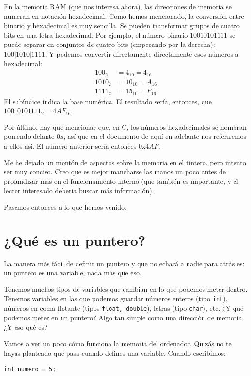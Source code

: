 \documentclass{hxc_cl}
\newcommand{\hex}{0\text{x}}
\begin{document}
En la memoria RAM (que nos interesa ahora), las direcciones de memoria se numeran en notación hexadecimal. Como hemos mencionado, la conversión entre binario y hexadecimal es muy sencilla. Se pueden transformar grupos de cuatro bits en una letra hexadecimal. Por ejemplo, el número binario $10010101111$ se puede separar en conjuntos de cuatro bits (empezando por la derecha): $100|1010|1111$. Y podemos convertir directamente directamente esos números a hexadecimal:
\begin{align*}
100_2&=4_{10}=4_{16}\\
1010_2&=10_{10}=A_{16}\\
1111_2&=15_{10}=F_{16}
\end{align*}
El subíndice indica la base numérica. El resultado sería, entonces, que $10010101111_2=4AF_{16}$.

Por último, hay que mencionar que, en C, los números hexadecimales se nombran poniendo delante 0x, así que en el documento de aquí en adelante nos referiremos a ellos así. El número anterior sería entonces $\hex4AF$.

Me he dejado un montón de aspectos sobre la memoria en el tintero, pero intento ser muy conciso. Creo que es mejor mancharse las manos un poco antes de profundizar más en el funcionamiento interno (que también es importante, y el lector interesado debería buscar más información).

Pasemos entonces a lo que hemos venido.

\section{¿Qué es un puntero?}
La manera más fácil de definir un puntero y que no echará a nadie para atrás es: un puntero es una variable, nada más que eso.

Tenemos muchos tipos de variables que cambian en lo que podemos meter dentro. Tenemos variables en las que podemos guardar números enteros (tipo \texttt{int}), números en coma flotante (tipos \texttt{float, double}), letras (tipo \texttt{char}), etc. ¿Y qué podemos meter en un puntero? Algo tan simple como una dirección de memoria. ¿Y eso qué es?

Vamos a ver un poco cómo funciona la memoria del ordenador. Quizás no te hayas planteado qué pasa cuando defines una variable. Cuando escribimos:

\begin{lstlisting}
int numero = 5;
\end{lstlisting}
\end{document}
